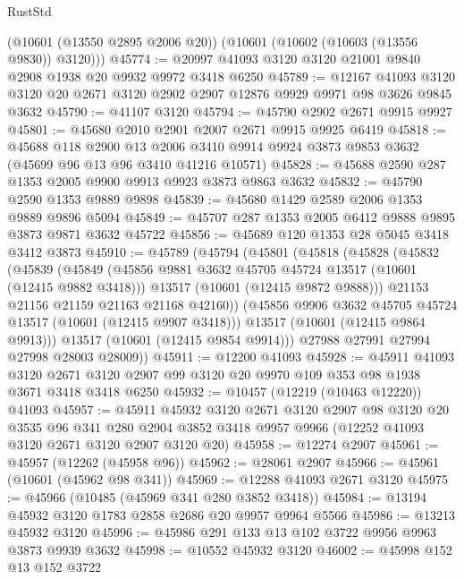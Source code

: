 \begin{lexlean}{RustStd}
\begin{coremodule}
      (@10601 (@13550 @2895 @2006 @20))
      (@10601 (@10602 (@10603 (@13556 @9830)) @3120)))
@45774 := @20997 @41093 @3120 @3120 @21001 @9840 @2908 @1938 @20 @9932 @9972 @3418 @6250
@45789 := @12167
    @41093
    @3120
    @3120
    @20
    @2671
    @3120
    @2902
    @2907
    @12876
    @9929
    @9971
    @98
    @3626
    @9845
    @3632
@45790 := @41107 @3120
@45794 := @45790 @2902 @2671 @9915 @9927
@45801 := @45680 @2010 @2901 @2007 @2671 @9915 @9925 @6419
@45818 := @45688
    @118
    @2900
    @13
    @2006
    @3410
    @9914
    @9924
    @3873
    @9853
    @3632
    (@45699 @96 @13 @96 @3410 @41216 @10571)
@45828 := @45688 @2590 @287 @1353 @2005 @9900 @9913 @9923 @3873 @9863 @3632
@45832 := @45790 @2590 @1353 @9889 @9898
@45839 := @45680 @1429 @2589 @2006 @1353 @9889 @9896 @5094
@45849 := @45707 @287 @1353 @2005 @6412 @9888 @9895 @3873 @9871 @3632 @45722
@45856 := @45689 @120 @1353 @28 @5045 @3418 @3412 @3873
@45910 := @45789
    (@45794
      (@45801
        (@45818
          (@45828
            (@45832
              (@45839
                (@45849
                  (@45856 @9881 @3632 @45705 @45724 @13517 (@10601 (@12415 @9882 @3418)))
                  @13517
                  (@10601 (@12415 @9872 @9888)))
                @21153
                @21156
                @21159
                @21163
                @21168
                @42160))
            (@45856 @9906 @3632 @45705 @45724 @13517 (@10601 (@12415 @9907 @3418)))
            @13517
            (@10601 (@12415 @9864 @9913)))
          @13517
          (@10601 (@12415 @9854 @9914)))
        @27988
        @27991
        @27994
        @27998
        @28003
        @28009))
@45911 := @12200 @41093
@45928 := @45911
    @41093
    @3120
    @2671
    @3120
    @2907
    @99
    @3120
    @20
    @9970
    @109
    @353
    @98
    @1938
    @3671
    @3418
    @3418
    @6250
@45932 := @10457 (@12219 (@10463 @12220)) @41093
@45957 := @45911
    @45932
    @3120
    @2671
    @3120
    @2907
    @98
    @3120
    @20
    @3535
    @96
    @341
    @280
    @2904
    @3852
    @3418
    @9957
    @9966
    (@12252 @41093 @3120 @2671 @3120 @2907 @3120 @20)
@45958 := @12274 @2907
@45961 := @45957 (@12262 (@45958 @96))
@45962 := @28061 @2907
@45966 := @45961 (@10601 (@45962 @98 @341))
@45969 := @12288 @41093 @2671 @3120
@45975 := @45966 (@10485 (@45969 @341 @280 @3852 @3418))
@45984 := @13194 @45932 @3120 @1783 @2858 @2686 @20 @9957 @9964 @5566
@45986 := @13213 @45932 @3120
@45996 := @45986 @291 @133 @13 @102 @3722 @9956 @9963 @3873 @9939 @3632
@45998 := @10552 @45932 @3120
@46002 := @45998 @152 @13 @152 @3722

\end{coremodule}
\end{lexlean}
